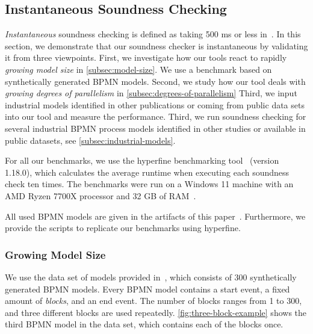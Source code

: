 \documentclass[runningheads]{llncs}
\begin{document}
\subsection{Instantaneous Soundness Checking} \label{sec:instantaneous}
\textit{Instantaneous} soundness checking is defined as taking 500 ms or less in~\cite{fahlandAnalysisDemandInstantaneous2011}.
In this section, we demonstrate that our soundness checker is instantaneous by validating it from three viewpoints.
First, we investigate how our tools react to rapidly \textit{growing model size} in \autoref{subsec:model-size}.
We use a benchmark based on synthetically generated BPMN models.
Second, we study how our tool deals with \textit{growing degrees of parallelism} in \autoref{subsec:degrees-of-parallelism}
Third, we input industrial models identified in other publications or coming from public data sets into our tool and measure the performance.
Third, we run soundness checking for several industrial BPMN process models identified in other studies or available in public datasets, see \autoref{subsec:industrial-models}. %

For all our benchmarks, we use the hyperfine benchmarking tool~\cite{peterHyperfine2023} (version 1.18.0), which calculates the average runtime when executing each soundness check ten times.
The benchmarks were run on a Windows 11 machine with an AMD Ryzen 7700X processor and 32 GB of RAM~\cite{noauthorgivenBPM2024Artifacts2024}.

All used BPMN models are given in the artifacts of this paper~\cite{noauthorgivenBPM2024Artifacts2024}.
Furthermore, we provide the scripts to replicate our benchmarks using hyperfine.


\subsubsection{Growing Model Size} \label{subsec:model-size}
We use the data set of models provided in~\cite{krauterHigherorderTransformationApproach2023}, which consists of 300 synthetically generated BPMN models.
Every BPMN model contains a start event, a fixed amount of \textit{blocks}, and an end event.
The number of blocks ranges from 1 to 300, and three different blocks are used repeatedly.
\autoref{fig:three-block-example} shows the third BPMN model in the data set, which contains each of the blocks once.
\end{document}
